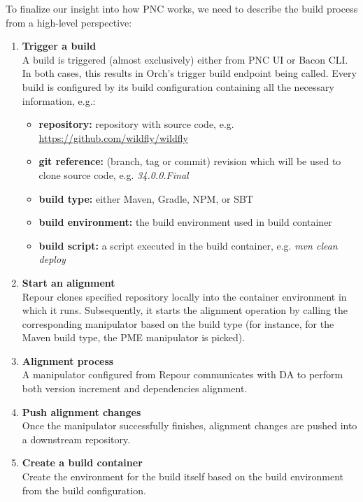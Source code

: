 \documentclass[../main.tex]{subfiles}
\begin{document}
To finalize our insight into how PNC works, we need to describe the build process from a high-level perspective:
\begin{enumerate}
    \item \textbf{Trigger a build}\\
    A build is triggered (almost exclusively) either from PNC UI or Bacon CLI. In both cases, this results in Orch's trigger build endpoint being called. Every build is configured by its build configuration containing all the necessary information, e.g.:
    \begin{itemize}
        \item \textbf{repository:} repository with source code, e.g. \url{https://github.com/wildfly/wildfly}
        \item \textbf{git reference:} (branch, tag or commit) revision which will be used to clone source code, e.g. \textit{34.0.0.Final}
        \item \textbf{build type:} either Maven, Gradle, NPM, or SBT
        \item \textbf{build environment:} the build environment used in build container
        \item \textbf{build script:} a script executed in the build container, e.g. \textit{mvn clean deploy}
    \end{itemize}

    \item \textbf{Start an alignment}\\
    Repour clones specified repository locally into the container environment in which it runs. Subsequently, it starts the alignment operation by calling the corresponding manipulator based on the build type (for instance, for the Maven build type, the PME manipulator is picked).

    \item \textbf{Alignment process}\\
    A manipulator configured from Repour communicates with DA to perform both version increment and dependencies alignment.

    \item \textbf{Push alignment changes}\\
    Once the manipulator successfully finishes, alignment changes are pushed into a downstream repository.

    \item \textbf{Create a build container}\\
    Create the environment for the build itself based on the build environment from the build configuration.


\end{enumerate}
\end{document}
